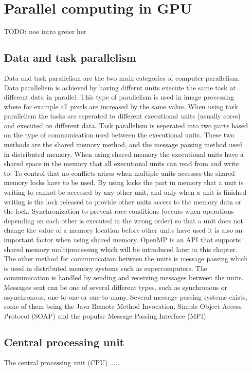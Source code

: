 \chapter{Parallel computing in GPU}
TODO: noe intro greier her

\section{Data and task parallelism}
Data and task parallelism are the two main categories of computer parallelism. Data parallelism is achieved by having differnt units execute the same task at different data in parallel. This type of parallelism is used in image processing where for example all pixels are increased by the same value. 
When using task parallelism the tasks are seperated to different executional units (usually cores) and executed on different data. Task parallelism is seperated into two parts based on the type of communication used between the executional units. These two methods are the shared memory method, and the message passing method used in distributed memory. When using shared memory the executional units have a shared space in the memory that all executional units can read from and write to. To control that no conflicts arises when multiple units accesses the shared memory locks have to be used. By using locks the part in memory that a unit is writing to cannot be accessed by any other unit, and only when a unit is finished writing is the lock released to provide other units access to the memory data or the lock. Synchronization to prevent race conditions (occurs when operations depending on each other is executed in the wrong order) so that a unit does not change the value of a memory location before other units have used it is also an important factor when using shared memory. OpenMP is an API that supports shared memory multiprocessing which will be introduced later in this chapter. The other method for communication between the units is message passing which is used in distributed memory systems such as supercomputers. The communication is handled by sending and receiving messages between the units. Messages sent can be one of several different types, such as synchronous or asynchronous, one-to-one or one-to-many. Several message passing systems exists, some of them being the Java Remote Method Invocation, Simple Object Access Protocol (SOAP) and the popular Message Passing Interface (MPI). 

\section{Central processing unit}
The central processing unit (CPU) .....

